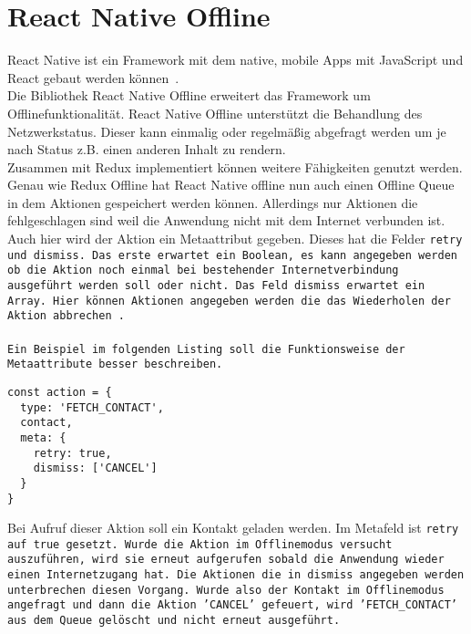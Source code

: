 \section{React Native Offline}
React Native ist ein Framework mit dem native, mobile Apps mit JavaScript und React gebaut werden können~\cite{rn}.\\
Die Bibliothek React Native Offline erweitert das Framework um Offlinefunktionalität.  
React Native Offline unterstützt die Behandlung des Netzwerkstatus. Dieser kann einmalig oder regelmäßig abgefragt  werden um je nach Status z.B. einen anderen Inhalt zu rendern.\\
Zusammen mit Redux implementiert können weitere Fähigkeiten genutzt werden.
Genau wie Redux Offline hat React Native offline nun auch einen Offline \gls{Queue} in dem Aktionen gespeichert werden können. Allerdings nur Aktionen die fehlgeschlagen sind weil die Anwendung nicht mit dem Internet verbunden ist.
Auch hier wird der Aktion ein Metaattribut gegeben. Dieses hat die Felder \tt{retry} und \tt{dismiss}. Das erste erwartet ein Boolean, es kann angegeben werden ob die Aktion noch einmal bei bestehender Internetverbindung ausgeführt werden soll oder nicht.
Das Feld \tt{dismiss} erwartet ein Array. Hier können Aktionen angegeben werden die das Wiederholen der Aktion abbrechen~\cite{rn-offline-gh}.\\\\
Ein Beispiel im folgenden Listing soll die Funktionsweise der Metaattribute besser beschreiben.
\begin{lstlisting}
const action = {
  type: 'FETCH_CONTACT',
  contact,
  meta: {
    retry: true,
    dismiss: ['CANCEL']
  }
}
\end{lstlisting}
Bei Aufruf dieser Aktion soll ein Kontakt geladen werden. Im Metafeld ist \tt{retry} auf \tt{true} gesetzt. Wurde die Aktion im Offlinemodus versucht auszuführen, wird sie erneut aufgerufen sobald die Anwendung wieder einen Internetzugang hat.
Die Aktionen die in \tt{dismiss} angegeben werden unterbrechen diesen Vorgang.
Wurde also der Kontakt im Offlinemodus angefragt und dann die Aktion 'CANCEL' gefeuert, wird 'FETCH\_CONTACT' aus dem Queue gelöscht und nicht erneut ausgeführt.
